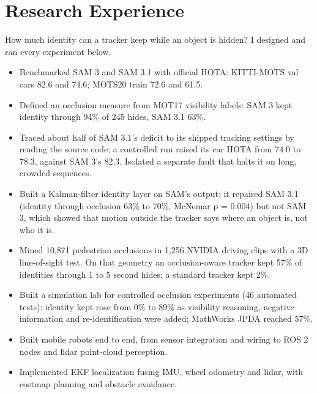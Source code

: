 \documentclass[10pt,letterpaper]{article}
\begin{document}
\section{Research Experience}
How much identity can a tracker keep while an object is hidden? I designed and ran every experiment below.\par\vspace{1pt}
\begin{itemize}
  \item Benchmarked SAM 3 and SAM 3.1 with official HOTA: KITTI-MOTS val cars 82.6 and 74.6; MOTS20 train 72.6 and 61.5.
  \item Defined an occlusion measure from MOT17 visibility labels: SAM 3 kept identity through 94\% of 245 hides, SAM 3.1 63\%.
  \item Traced about half of SAM 3.1's deficit to its shipped tracking settings by reading the source code; a controlled run raised its car
        HOTA from 74.0 to 78.3, against SAM 3's 82.3. Isolated a separate fault that halts it on long, crowded sequences.
  \item Built a Kalman-filter identity layer on SAM's output: it repaired SAM 3.1 (identity through occlusion 63\% to 70\%, McNemar
        p = 0.004) but not SAM 3, which showed that motion outside the tracker says where an object is, not who it is.
  \item Mined 10,871 pedestrian occlusions in 1,256 NVIDIA driving clips with a 3D line-of-sight test. On that
        geometry an occlusion-aware tracker kept 57\% of identities through 1 to 5 second hides; a standard tracker kept 2\%.
  \item Built a simulation lab for controlled occlusion experiments (46 automated tests): identity kept rose from 0\% to 89\% as visibility
        reasoning, negative information and re-identification were added; MathWorks JPDA reached 57\%.
\end{itemize}

\begin{itemize}
  \item Built mobile robots end to end, from sensor integration and wiring to ROS 2 nodes and lidar point-cloud perception.
  \item Implemented EKF localization fusing IMU, wheel odometry and lidar, with costmap planning and obstacle avoidance.
\end{itemize}
\end{document}
